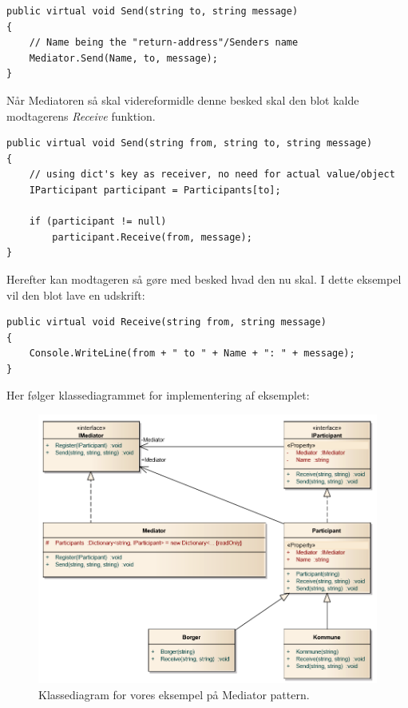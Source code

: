 \begin{lstlisting}
public virtual void Send(string to, string message)
{
	// Name being the "return-address"/Senders name
	Mediator.Send(Name, to, message);
}
\end{lstlisting}

Når Mediatoren så skal videreformidle denne besked skal den blot kalde modtagerens \textit{Receive} funktion.

\begin{lstlisting}
public virtual void Send(string from, string to, string message)
{
	// using dict's key as receiver, no need for actual value/object
	IParticipant participant = Participants[to];
	
	if (participant != null)
		participant.Receive(from, message);
}
\end{lstlisting}

Herefter kan modtageren så gøre med besked hvad den nu skal. I dette eksempel vil den blot lave en udskrift:

\begin{lstlisting}
public virtual void Receive(string from, string message)
{
	Console.WriteLine(from + " to " + Name + ": " + message);
}
\end{lstlisting}

Her følger klassediagrammet for implementering af eksemplet:

\begin{figure}[h]
	\centering
	\includegraphics[width=\linewidth]{figs/classdiagram}
	\caption{Klassediagram for vores eksempel på Mediator pattern.}
	\label{fig:mediclass}
\end{figure}